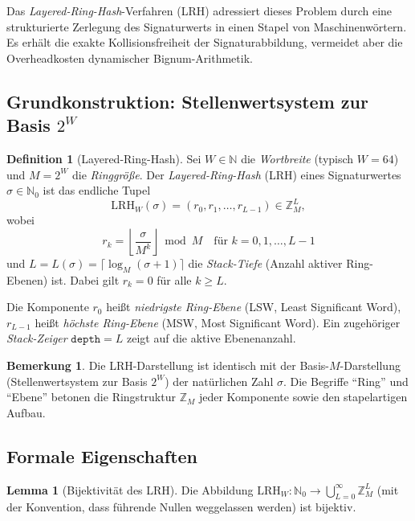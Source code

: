 ﻿\documentclass[a4paper,12pt]{article}
\theoremstyle{definition}
\newtheorem{definition}{Definition}
\newtheorem{lemma}{Lemma}
\newtheorem{bemerkung}{Bemerkung}
\begin{document}
Das \emph{Layered-Ring-Hash}-Verfahren (LRH) adressiert dieses Problem durch eine
strukturierte Zerlegung des Signaturwerts in einen Stapel von Maschinenwörtern.
Es erhält die exakte Kollisionsfreiheit der Signaturabbildung, vermeidet aber die
Overheadkosten dynamischer Bignum-Arithmetik.

\subsection{Grundkonstruktion: Stellenwertsystem zur Basis $2^W$}

\begin{definition}[Layered-Ring-Hash]
\label{def:lrh}
Sei $W \in \mathbb{N}$ die \emph{Wortbreite} (typisch $W = 64$) und
$M = 2^W$ die \emph{Ringgröße}. Der \emph{Layered-Ring-Hash} (LRH) eines
Signaturwertes $\sigma \in \mathbb{N}_0$ ist das endliche Tupel
\[
  \mathrm{LRH}_W(\sigma) = (r_0, r_1, \ldots, r_{L-1}) \in \mathbb{Z}_M^L,
\]
wobei
\[
  r_k = \left\lfloor \frac{\sigma}{M^k} \right\rfloor \bmod M
        \quad \text{für } k = 0, 1, \ldots, L-1
\]
und $L = L(\sigma) = \lceil \log_M(\sigma + 1) \rceil$ die \emph{Stack-Tiefe}
(Anzahl aktiver Ring-Ebenen) ist. Dabei gilt $r_k = 0$ für alle $k \geq L$.

Die Komponente $r_0$ heißt \emph{niedrigste Ring-Ebene} (LSW, Least Significant Word),
$r_{L-1}$ heißt \emph{höchste Ring-Ebene} (MSW, Most Significant Word).
Ein zugehöriger \emph{Stack-Zeiger} $\mathtt{depth} = L$ zeigt auf die aktive Ebenenanzahl.
\end{definition}

\begin{bemerkung}
Die LRH-Darstellung ist identisch mit der Basis-$M$-Darstellung (Stellenwertsystem zur
Basis $2^W$) der natürlichen Zahl $\sigma$. Die Begriffe ``Ring'' und ``Ebene'' betonen
die Ringstruktur $\mathbb{Z}_M$ jeder Komponente sowie den stapelartigen Aufbau.
\end{bemerkung}

\subsection{Formale Eigenschaften}

\begin{lemma}[Bijektivität des LRH]
\label{lem:lrh_bij}
Die Abbildung $\mathrm{LRH}_W: \mathbb{N}_0 \to \bigcup_{L=0}^{\infty} \mathbb{Z}_M^L$
(mit der Konvention, dass führende Nullen weggelassen werden) ist bijektiv.
\end{lemma}
\end{document}
